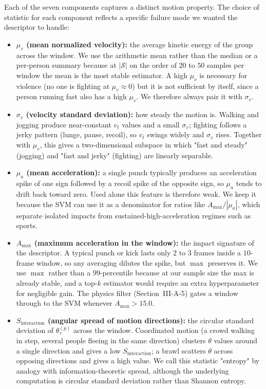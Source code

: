 \documentclass[conference]{IEEEtran}
\begin{document}
Each of the seven components captures a distinct motion property. The choice of statistic for each component reflects a specific failure mode we wanted the descriptor to handle:

\begin{itemize}
    \item \textbf{$\mu_v$ (mean normalized velocity):} the average kinetic energy of the group across the window. We use the arithmetic mean rather than the median or a per-person summary because at $|\mathcal{S}|$ on the order of $20$ to $50$ samples per window the mean is the most stable estimator. A high $\mu_v$ is necessary for violence (no one is fighting at $\mu_v \approx 0$) but it is not sufficient by itself, since a person running fast also has a high $\mu_v$. We therefore always pair it with $\sigma_v$.

    \item \textbf{$\sigma_v$ (velocity standard deviation):} how steady the motion is. Walking and jogging produce near-constant $v_t$ values and a small $\sigma_v$; fighting follows a jerky pattern (lunge, pause, recoil), so $v_t$ swings widely and $\sigma_v$ rises. Together with $\mu_v$, this gives a two-dimensional subspace in which "fast and steady" (jogging) and "fast and jerky" (fighting) are linearly separable.

    \item \textbf{$\mu_a$ (mean acceleration):} a single punch typically produces an acceleration spike of one sign followed by a recoil spike of the opposite sign, so $\mu_a$ tends to drift back toward zero. Used alone this feature is therefore weak. We keep it because the SVM can use it as a denominator for ratios like $A_{\max}/|\mu_a|$, which separate isolated impacts from sustained-high-acceleration regimes such as sports.

    \item \textbf{$A_{\max}$ (maximum acceleration in the window):} the impact signature of the descriptor. A typical punch or kick lasts only $2$ to $3$ frames inside a $10$-frame window, so any averaging dilutes the spike, but $\max$ preserves it. We use $\max$ rather than a $99$-percentile because at our sample size the max is already stable, and a top-$k$ estimator would require an extra hyperparameter for negligible gain. The physics filter (Section~III-A-5) gates a window through to the SVM whenever $A_{\max} > 15.0$.

    \item \textbf{$S_{\mathrm{interaction}}$ (angular spread of motion directions):} the circular standard deviation of $\theta_\tau^{(p)}$ across the window. Coordinated motion (a crowd walking in step, several people fleeing in the same direction) clusters $\theta$ values around a single direction and gives a low $S_{\mathrm{interaction}}$; a brawl scatters $\theta$ across opposing directions and gives a high value. We call this statistic "entropy" by analogy with information-theoretic spread, although the underlying computation is circular standard deviation rather than Shannon entropy.


\end{itemize}
\end{document}

